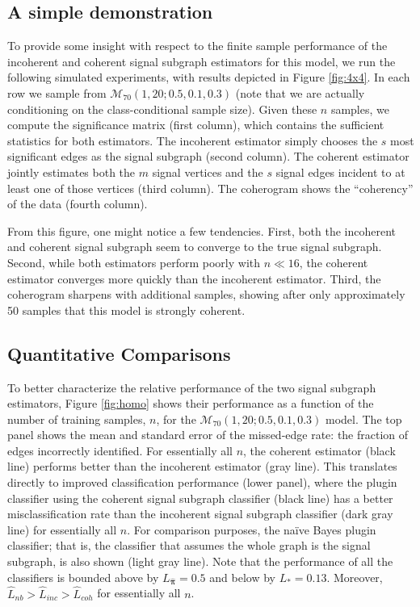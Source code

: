 \documentclass[10pt,journal,cspaper,compsoc]{IEEEtran}
\providecommand{\mc}[1]{\mathcal{#1}}
\providecommand{\mh}[1]{\hat{#1}}
\providecommand{\mhb}[1]{\hat{\boldsymbol{#1}}}
\begin{document}
\subsection{A simple demonstration} %
\label{sub:a_simple_demonstration}
  

To provide some insight with respect to the finite sample performance of the incoherent and coherent signal subgraph estimators for this model, we run the following simulated experiments, with results depicted in  Figure \ref{fig:4x4}.  In each row we sample from $\mc{M}_{70}(1,20;0.5,0.1,0.3)$  (note that we are actually conditioning on the class-conditional sample size).  Given these $n$ samples, we compute the significance matrix (first column), which contains the sufficient statistics for both estimators.  The incoherent estimator simply chooses the $s$ most significant edges as the signal subgraph (second column). The coherent estimator jointly estimates both the $m$ signal vertices and the $s$ signal edges incident to at least one of those vertices (third column).  The coherogram shows the ``coherency'' of the data (fourth column).    

From this figure, one might notice a few tendencies.  First, both the incoherent and coherent signal subgraph seem to converge to the true signal subgraph.  Second, while 
both estimators perform poorly with $n\ll 16$, 
the coherent estimator converges more quickly than the incoherent estimator.  Third, the coherogram sharpens with additional samples,  showing after only approximately 50 samples that this model is strongly coherent.


\subsection{Quantitative Comparisons} %
\label{sub:relative_efficiencies}


To better characterize the relative performance of the two signal subgraph estimators, Figure \ref{fig:homo} shows their performance as a function of the number of training samples, $n$, for the $\mc{M}_{70}(1,20;0.5,0.1,0.3)$ model.  The top panel shows the mean and standard error of the missed-edge rate: the fraction of edges incorrectly identified.  For essentially all $n$, the coherent estimator (black line) performs better than the incoherent estimator (gray line).  This translates directly to improved classification performance (lower panel), where the plugin classifier using the coherent signal subgraph classifier (black line) has a better misclassification rate than the incoherent signal subgraph classifier (dark gray line) for essentially all $n$.  For comparison purposes, the na\"ive Bayes plugin classifier; that is, the classifier that assumes the whole graph is the signal subgraph, is also shown (light gray line).  Note that the performance of all the classifiers is bounded above by $L_{\mhb{\pi}} = 0.5$ and below by $L_* = 0.13$.  Moreover,  $\mh{L}_{nb} > \mh{L}_{inc} > \mh{L}_{coh}$ for essentially all $n$.
\end{document}
